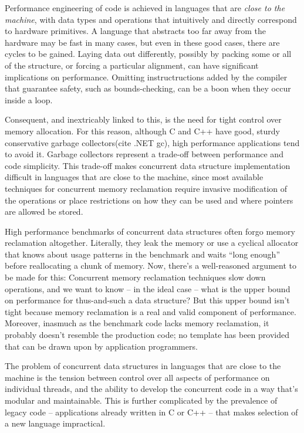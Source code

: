 Performance engineering of code is achieved in languages that are \textit{close to the machine},\cite{Ritchie} with data types and operations that intuitively and directly correspond to hardware primitives.  A language that abstracts too far away from the hardware may be fast in many cases, but even in these good cases, there are cycles to be gained.  Laying data out differently, possibly by packing some or all of the structure, or forcing a particular alignment, can have significant implications on performance.  Omitting instructructions added by the compiler that guarantee safety, such as bounds-checking, can be a boon when they occur inside a loop.

Consequent, and inextricably linked to this, is the need for tight control over memory allocation.  For this reason, although C and C++ have good, sturdy conservative garbage collectors\cite{BDW}(cite .NET gc), high performance applications tend to avoid it.  Garbage collectors represent a trade-off between performance and code simplicity.  This trade-off makes concurrent data structure implementation difficult in languages that are close to the machine, since most available techniques for concurrent memory reclamation require invasive modification of the operations or place restrictions on how they can be used and where pointers are allowed be stored.\cite{HP}\cite{DTA}\cite{StackTrack}\cite{Threadscan}

High performance benchmarks of concurrent data structures often forgo memory reclamation altogether.\cite{Synchrobench}\cite{Scal}  Literally, they leak the memory or use a cyclical allocator that knows about usage patterns in the benchmark and waits ``long enough'' before reallocating a chunk of memory.  Now, there's a well-reasoned argument to be made for this: Concurrent memory reclamation techniques slow down operations, and we want to know -- in the ideal case -- what is the upper bound on performance for thus-and-such a data structure?  But this upper bound isn't tight because memory reclamation is a real and valid component of performance.  Moreover, inasmuch as the benchmark code lacks memory reclamation, it probably doesn't resemble the production code; no template has been provided that can be drawn upon by application programmers.

The problem of concurrent data structures in languages that are close to the machine is the tension between control over all aspects of performance on individual threads, and the ability to develop the concurrent code in a way that's modular and maintainable.  This is further complicated by the prevalence of legacy code -- applications already written in C or C++ -- that makes selection of a new language impractical.

